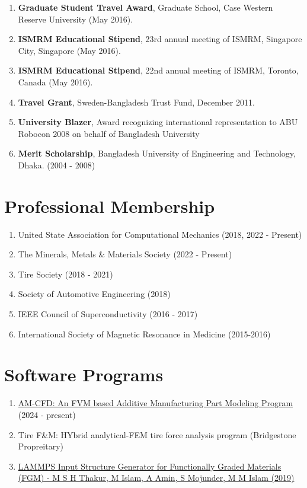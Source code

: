 \documentclass[11pt, letterpaper]{article}
\begin{document}
\begin{enumerate}[label=\arabic*., itemsep=-1pt, topsep=2pt]
        \item \textbf{Graduate Student Travel Award}, Graduate School, Case Western Reserve University (May 2016).
        \item \textbf{ISMRM Educational Stipend}, 23rd annual meeting of ISMRM, Singapore City, Singapore (May 2016).
        \item \textbf{ISMRM Educational Stipend}, 22nd annual meeting of ISMRM, Toronto, Canada (May 2016).
        \item \textbf{Travel Grant}, Sweden-Bangladesh Trust Fund, December 2011.
        \item \textbf{University Blazer}, Award recognizing international representation to ABU Robocon 2008 on behalf of Bangladesh University
        \item \textbf{Merit Scholarship}, Bangladesh University
of Engineering and Technology, Dhaka. (2004 - 2008)
    \end{enumerate}

\section{Professional Membership}
    \begin{enumerate}[label=\arabic*., itemsep=-1pt, topsep=2pt]
        \item United State Association for Computational Mechanics (2018, 2022 - Present)
        \item The Minerals, Metals \& Materials Society (2022 - Present)
        \item Tire Society (2018 - 2021)
        \item Society of Automotive Engineering (2018)
        \item IEEE Council of Superconductivity (2016 - 2017)
        \item International Society of Magnetic Resonance in Medicine (2015-2016)
    \end{enumerate}
    
\section{Software Programs}
    \begin{enumerate}[label=\arabic*., itemsep=-1pt, topsep=2pt]
        \item \href{https://github.com/neoceph/AM-CFD}{AM-CFD: An FVM based Additive Manufacturing Part Modeling Program} (2024 - present) 
        \item Tire F\&M: HYbrid analytical-FEM tire force analysis program (Bridgestone Propreitary)
        \item \href{https://nanohub.org/resources/fgmbuilder}{LAMMPS Input Structure Generator for Functionally Graded Materials (FGM) - M S H Thakur, M Islam, A Amin, S Mojunder, M M Islam (2019)}
    \end{enumerate}
\end{document}
